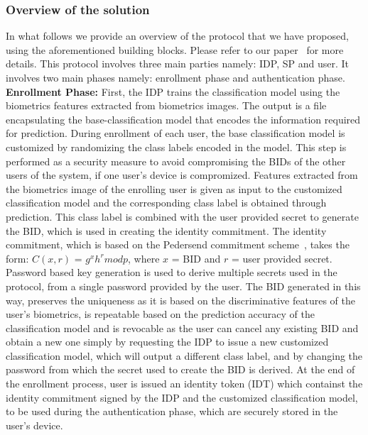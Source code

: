 \documentclass[10pt]{article}
\begin{document}
\subsubsection*{Overview of the solution}

In what follows we provide an overview of the protocol that we have proposed, using the aforementioned building blocks. Please refer to our 
paper~\cite{ours} for more details. This protocol involves three main parties namely: IDP, SP and user. It involves two main phases namely: 
enrollment phase and authentication phase.\\

\textbf{Enrollment Phase:}
First, the IDP trains the classification model using the biometrics features extracted from biometrics images. The output is a 
file encapsulating the base-classification model that encodes the information required for prediction. 
During enrollment of each user, the base classification model is customized by randomizing the class labels encoded in the 
model. This step is performed as a security measure to avoid compromising the BIDs of the other users of the system, if one user's device is 
compromized.
Features extracted from the biometrics image of the enrolling user is given as input to the customized classification model and the corresponding 
class label is obtained through prediction. This class label is combined with the user provided secret to generate the BID, which is used in creating 
the identity commitment. The identity commitment, which is based on the Pedersend commitment scheme~\cite{pedersenCommitment}, takes the form: $C (x, 
r)$ = $g^{x}h^{r} mod p$, where $x$ = BID and $r$ = user provided secret. Password based key generation is used to derive multiple secrets used in 
the protocol, from a single password provided by the user. The BID generated in this way, preserves the uniqueness as it is based on the 
discriminative features of the user's biometrics, is repeatable based on the prediction accuracy of the classification model and is revocable as the 
user can cancel any existing BID and obtain a new one simply by requesting the IDP to issue a new customized classification model, which will output 
a different class label, and by changing the password from which the secret used to create the BID is derived.
At the end of the enrollment process, user is issued an identity token (IDT) which containst the identity commitment signed by the IDP and the 
customized classification model, to be used during the authentication phase, which are securely stored in the user's device.\\
\end{document}
